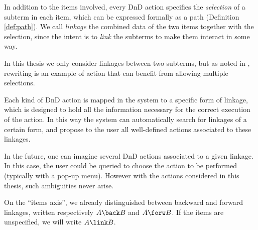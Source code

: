 
In addition to the items involved, every DnD action specifies the
\emph{selection} of a subterm in each item, which can be expressed formally as a
path (Definition \ref{def:path}). We call \emph{linkage} the combined data of
the two items together with the selection, since the intent is to \emph{link}
the subterms to make them interact in some way.

\begin{remark}
In this thesis we only consider linkages between two subterms, but as noted in
, rewriting is an example of action that can benefit from
allowing multiple selections.
\end{remark}

Each kind of DnD action is mapped in the system to a specific form of linkage,
which is designed to hold all the information necessary for the correct
execution of the action. In this way the system can automatically search for
linkages of a certain form, and propose to the user all well-defined actions
associated to these linkages.

\begin{remark}
  In the future, one can imagine several DnD actions associated to a given
  linkage. In this case, the user could be queried to choose the action to be
  performed (typically with a pop-up menu). However with the actions considered
  in this thesis, such ambiguities never arise.
\end{remark}

On the ``items axis'', we already distinguished between backward and forward
linkages, written respectively $A \back B$ and $A \forw B$. If the items are
unspecified, we will write $A \link B$.

